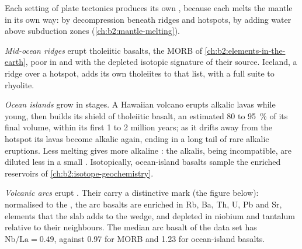 Each setting of plate tectonics produces its own , because each melts the
mantle in its own way: by decompression beneath ridges and hotspots, by adding water
above subduction zones (\cref{ch:b2:mantle-melting}).

\emph{Mid-ocean ridges} erupt tholeiitic basalts, the MORB of
\cref{ch:b2:elements-in-the-earth}, poor in  and with the
depleted isotopic signature of their source. Iceland, a ridge over a hotspot, adds
its own tholeiites to that list, with a full suite to rhyolite.

\emph{Ocean islands} grow in stages. A Hawaiian volcano erupts alkalic lavas while
young, then builds its shield of tholeiitic basalt, an estimated 80 to
\qty{95}{\percent} of its final volume, within its first 1 to 2 million years; as it
drifts away from the hotspot its lavas become alkalic again, ending in a long tail of
rare alkalic eruptions. Less melting gives more alkaline : the alkalis, being
incompatible, are diluted less in a small . Isotopically, ocean-island
basalts sample the enriched reservoirs of \cref{ch:b2:isotope-geochemistry}.

\emph{Volcanic arcs} erupt . Their  carry a
distinctive mark (the figure below): normalised to the , the arc
basalts are enriched in Rb, Ba, Th, U, Pb and Sr, elements that the slab adds to the
wedge, and depleted in niobium and tantalum relative to their neighbours. The median
arc basalt of the data set has $\mathrm{Nb}/\mathrm{La} = 0.49$, against 0.97 for MORB
and 1.23 for ocean-island basalts.

